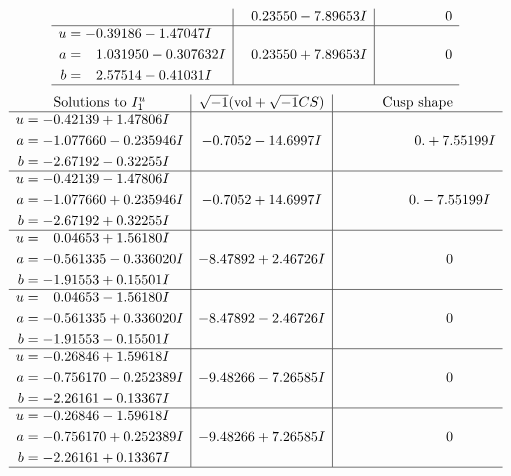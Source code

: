 \documentclass[1p]{elsarticle_modified}
\theoremstyle{definition}
\newcommand{\I}{\sqrt{-1}}
\begin{document}
$$\begin{array}{c|c|c}
 & \phantom{-}0.23550 - 7.89653 I & \phantom{-0.000000 } 0 \\ \hline\begin{aligned}
u &= -0.39186 - 1.47047 I \\
a &= \phantom{-}1.031950 - 0.307632 I \\
b &= \phantom{-}2.57514 - 0.41031 I\end{aligned}
 & \phantom{-}0.23550 + 7.89653 I & \phantom{-0.000000 } 0\\
 \hline 
 \end{array}$$\newpage$$\begin{array}{c|c|c}  
\text{Solutions to }I^u_{1}& \I (\text{vol} + \sqrt{-1}CS) & \text{Cusp shape}\\
 \hline 
\begin{aligned}
u &= -0.42139 + 1.47806 I \\
a &= -1.077660 - 0.235946 I \\
b &= -2.67192 - 0.32255 I\end{aligned}
 & -0.7052 - 14.6997 I & \phantom{-0.000000 -}0. + 7.55199 I \\ \hline\begin{aligned}
u &= -0.42139 - 1.47806 I \\
a &= -1.077660 + 0.235946 I \\
b &= -2.67192 + 0.32255 I\end{aligned}
 & -0.7052 + 14.6997 I & \phantom{-0.000000 } 0. - 7.55199 I \\ \hline\begin{aligned}
u &= \phantom{-}0.04653 + 1.56180 I \\
a &= -0.561335 - 0.336020 I \\
b &= -1.91553 + 0.15501 I\end{aligned}
 & -8.47892 + 2.46726 I & \phantom{-0.000000 } 0 \\ \hline\begin{aligned}
u &= \phantom{-}0.04653 - 1.56180 I \\
a &= -0.561335 + 0.336020 I \\
b &= -1.91553 - 0.15501 I\end{aligned}
 & -8.47892 - 2.46726 I & \phantom{-0.000000 } 0 \\ \hline\begin{aligned}
u &= -0.26846 + 1.59618 I \\
a &= -0.756170 - 0.252389 I \\
b &= -2.26161 - 0.13367 I\end{aligned}
 & -9.48266 - 7.26585 I & \phantom{-0.000000 } 0 \\ \hline\begin{aligned}
u &= -0.26846 - 1.59618 I \\
a &= -0.756170 + 0.252389 I \\
b &= -2.26161 + 0.13367 I\end{aligned}
 & -9.48266 + 7.26585 I & \phantom{-0.000000 } 0\\
 \hline 
 \end{array}$$\newpage\newpage\renewcommand{\arraystretch}{1}
\end{document}
